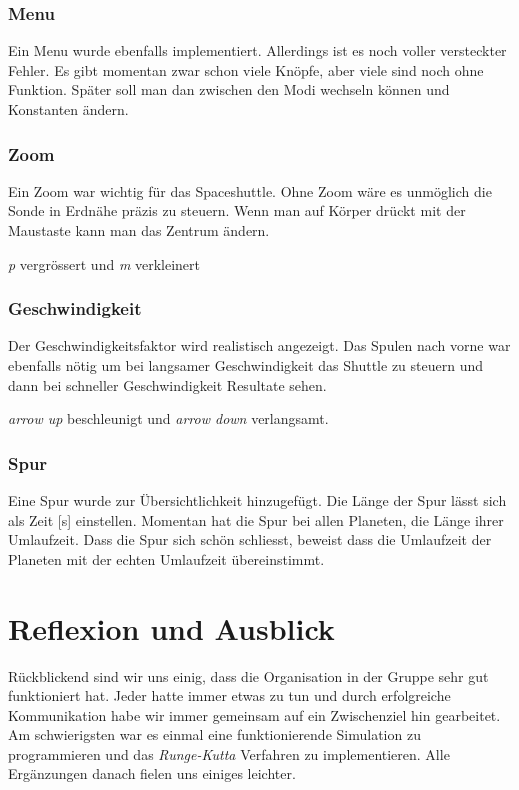 \documentclass{article}
\begin{document}
\subsubsection{Menu}
Ein Menu wurde ebenfalls implementiert. Allerdings ist es noch voller versteckter Fehler. Es gibt momentan zwar schon viele Knöpfe, aber viele sind noch ohne Funktion. Später soll man dan zwischen den Modi wechseln können und Konstanten ändern.
\subsubsection{Zoom}
Ein Zoom war wichtig für das Spaceshuttle. Ohne Zoom wäre es unmöglich die Sonde in Erdnähe präzis zu steuern. Wenn man auf Körper drückt mit der Maustaste kann man das Zentrum ändern.

\textit{p} vergrössert und \textit{m} verkleinert
\subsubsection{Geschwindigkeit}
Der Geschwindigkeitsfaktor wird realistisch angezeigt. Das Spulen nach vorne war ebenfalls nötig um bei langsamer Geschwindigkeit das Shuttle zu steuern und dann bei schneller Geschwindigkeit Resultate sehen.

\textit{arrow up} beschleunigt und \textit{arrow down} verlangsamt.

\subsubsection{Spur}
Eine Spur wurde zur Übersichtlichkeit hinzugefügt. Die Länge der Spur lässt sich als Zeit [s] einstellen. Momentan hat die Spur bei allen Planeten, die Länge ihrer Umlaufzeit. Dass die Spur sich schön schliesst, beweist dass die Umlaufzeit der Planeten mit der echten Umlaufzeit übereinstimmt.


\section{Reflexion und Ausblick}
Rückblickend sind wir uns einig, dass die Organisation in der Gruppe sehr gut funktioniert hat. Jeder hatte immer etwas zu tun und durch erfolgreiche Kommunikation habe wir immer gemeinsam auf ein Zwischenziel hin gearbeitet. Am schwierigsten war es einmal eine funktionierende Simulation zu programmieren und das \textit{Runge-Kutta} Verfahren zu implementieren. Alle Ergänzungen danach fielen uns einiges leichter. 
\end{document}
